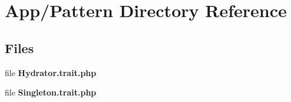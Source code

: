 \section{App/\+Pattern Directory Reference}
\label{dir_0c6abf23d932d952362f1adc98f33c71}
\subsection*{Files}
\begin{DoxyCompactItemize}
\item 
file \textbf{ Hydrator.\+trait.\+php}
\item 
file \textbf{ Singleton.\+trait.\+php}
\end{DoxyCompactItemize}
